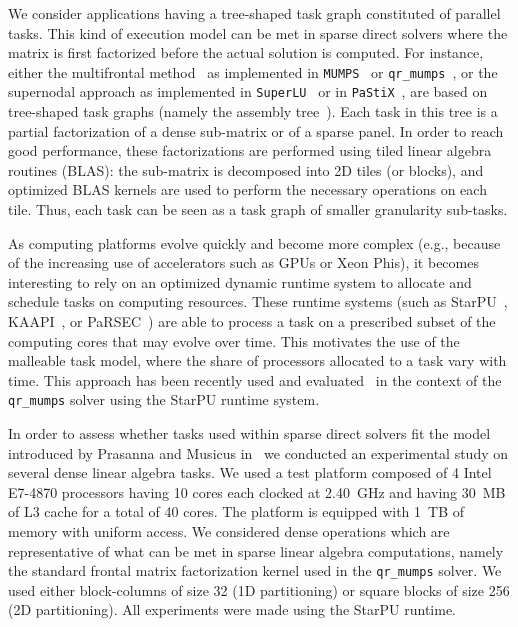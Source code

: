 \documentclass{llncs}
\newcommand{\qrm}{\texttt{qr\_mumps}\xspace}
\newcommand{\mumps}{\texttt{MUMPS}\xspace}
\newcommand{\superlu}{\texttt{SuperLU}\xspace}
\newcommand{\pastix}{\texttt{PaStiX}\xspace}
\begin{document}
We consider applications having a tree-shaped task
graph constituted of parallel tasks. This kind of
execution model can be met in sparse direct solvers where the matrix
is first factorized before the actual solution is computed. For
instance, either the multifrontal method~\cite{dure:83} as implemented
in \mumps~\cite{mumps11} or \qrm~\cite{buttari10}, or the supernodal
approach as implemented in \superlu~\cite{superlu} or
in \pastix~\cite{pastix}, are based on tree-shaped task graphs (namely the
assembly tree~\cite{aglp:87}).  Each task in this tree is a partial
factorization of a dense sub-matrix or of a sparse panel. In order to
reach good performance, these factorizations are performed using tiled
linear algebra routines (BLAS): the sub-matrix is decomposed into 2D
tiles (or blocks), and optimized BLAS kernels are used to perform the
necessary operations on each tile. Thus, each task can be seen as a
task graph of smaller granularity sub-tasks.







As computing platforms evolve quickly and become more complex (e.g.,
because of the increasing use of accelerators such as GPUs or Xeon
Phis), it becomes interesting to rely on an optimized dynamic runtime
system to allocate and schedule tasks on computing resources. These
runtime systems (such as StarPU~\cite{starpu}, KAAPI~\cite{kaapi}, or
PaRSEC~\cite{parsec}) are able to process a task on a prescribed
subset of the computing cores that may evolve over time. This
motivates the use of the malleable task model, where the share of
processors allocated to a task vary with time. This approach has been
recently used and evaluated~\cite{hugo14} in the context of the \qrm
solver using the StarPU runtime system.

In order to assess whether tasks used within sparse direct
solvers fit the model introduced by Prasanna and Musicus
in~\cite{prasmus2} we conducted an experimental study on several dense
linear algebra tasks. We used a test platform composed of 4 Intel
E7-4870 processors having 10 cores each clocked at 2.40~GHz and having
30~MB of L3 cache for a total of 40 cores. The platform is equipped
with 1~TB of memory with uniform access. We considered dense
operations which are representative of what can be met in sparse
linear algebra computations, namely the standard frontal matrix
factorization kernel used in the \qrm solver. We used either
block-columns of size 32 (1D partitioning) or square blocks of size
256 (2D partitioning). All experiments were made using the StarPU
runtime.
\end{document}
